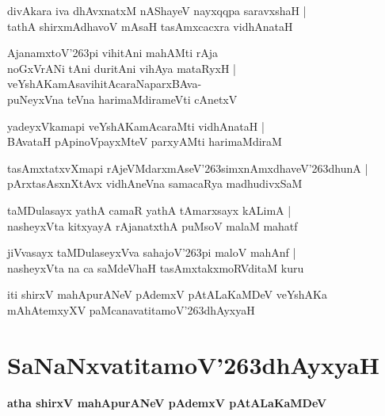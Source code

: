 \documentclass[twoside,12pt,openright]{book}
\def\S{\char'263}
\newcounter{shloka}[chapter]
\begin{document}
\begin{shloka}%
divAkara iva dhAvxnatxM nAShayeV nayxqqpa saravxshaH |\\
tathA shirxmAdhavoV mAsaH tasAmxcacxra vidhAnataH 
\end{shloka}

\begin{shloka}%
AjanamxtoV\S pi vihitAni mahAMti rAja \\
noGxVrANi tAni duritAni vihAya mataRyxH |\\
veYshAKamAsavihitAcaraNaparxBAva- \\
puNeyxVna teVna harimaMdirameVti cAnetxV 
\end{shloka}

\begin{shloka}%
yadeyxVkamapi veYshAKamAcaraMti vidhAnataH |\\
BAvataH pApinoVpayxMteV parxyAMti harimaMdiraM 
\end{shloka}

\begin{shloka}%
tasAmxtatxvXmapi rAjeVMdarxmAseV\S simxnAmxdhaveV\S dhunA |\\
pArxtasAsxnXtAvx vidhAneVna samacaRya madhudivxSaM 
\end{shloka}

\begin{shloka}%
taMDulasayx yathA camaR yathA tAmarxsayx kALimA |\\
nasheyxVta kitxyayA rAjanatxthA puMsoV malaM mahatf
\end{shloka}

\begin{shloka}%
jiVvasayx taMDulaseyxVva sahajoV\S pi maloV mahAnf |\\
nasheyxVta na ca saMdeVhaH tasAmxtakxmoRVditaM kuru
\end{shloka}

\begin{center}
iti shirxV mahApurANeV pAdemxV pAtALaKaMDeV veYshAKa mAhAtemxyXV 
paMcanavatitamoV\S dhAyxyaH
\end{center}

\chapter{SaNaNxvatitamoV\S dhAyxyaH}

\begin{center}
{\LARGE\bfseries atha shirxV mahApurANeV pAdemxV pAtALaKaMDeV }
\end{center}
\end{document}
